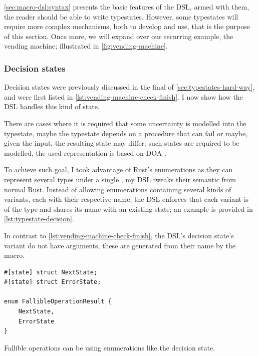 \autoref{sec:macro-dsl:syntax} presents the basic features of the DSL,
armed with them, the reader should be able to write typestates.
However, some typestates will require more complex mechanisms, both to develop and use,
that is the purpose of this section.
Once more, we will expand over our recurring example, the vending machine; illustrated in \autoref{fig:vending-machine}.

\subsubsection{Decision states}
Decision states were previously discussed in the final of \autoref{sec:typestates-hard-way},
and were first listed in \autoref{lst:vending-machine-check-finish}.
I now show how the DSL handles this kind of state.

There are cases where it is required that some uncertainty is modelled into the typestate,
maybe the typestate depends on a procedure that can fail or maybe, given the input, the resulting state may differ;
such states are required to be modelled, the used representation is based on \gls{DOA} \autocite{Trindade2020}.

To achieve such goal, I took advantage of Rust's enumerations as they can represent several types under a single ,
my DSL tweaks their semantic from normal Rust.
Instead of allowing enumerations containing several kinds of variants, each with their respective name,
the DSL enforces that each variant is of the 
type and shares its name with an existing state; an example is provided in \autoref{lst:typestate-decision}.

In contrast to \autoref{lst:vending-machine-check-finish}, the DSL's decision state's variant do not have arguments,
these are generated from their name by the macro.

\begin{listing}
    \begin{verbatim}
#[state] struct NextState;
#[state] struct ErrorState;

enum FallibleOperationResult {
    NextState,
    ErrorState
}
    \end{verbatim}
    \caption{Fallible operations can be using enumerations like the \textcolor{structblue}{} decision state.}
    \label{lst:typestate-decision}
\end{listing}

